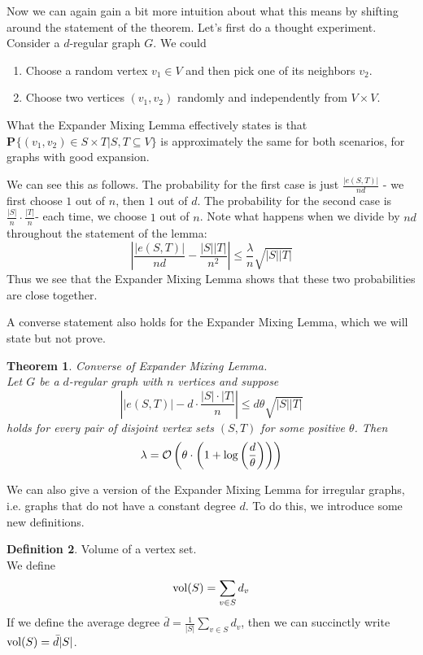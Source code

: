 \documentclass[11pt]{article}
\newtheorem{theorem}{Theorem}[section]
\theoremstyle{definition}
\newtheorem{definition}[theorem]{Definition}
\theoremstyle{definition}
\theoremstyle{definition}
\newcommand{\mc}[1]
{\mathcal{#1}}
\newcommand{\txt}[1]
{\textnormal{#1}}
\newcommand{\prob}[2]
{\textbf{P}_{#1}\{{#2}\}}
\begin{document}
Now we can again gain a bit more intuition about what this means by shifting around the statement of the theorem. Let's first do a thought experiment. Consider a $d$-regular graph $G$. We could 

\begin{enumerate}

\item Choose a random vertex $v_1 \in V$ and then pick one of its neighbors $v_2$. 

\item Choose two vertices $(v_1, v_2)$ randomly and independently from $V \times V$. 

\end{enumerate}

What the Expander Mixing Lemma effectively states is that $\prob{}{(v_1, v_2) \in S \times T | S, T \subseteq V}$ is approximately the same for both scenarios, for graphs with good expansion. 

We can see this as follows. The probability for the first case is just $\frac{|e(S, T)|}{nd}$ - we first choose $1$ out of $n$, then $1$ out of $d$. The probability for the second case is $\frac{|S|}{n} \cdot \frac{|T|}{n}$- each time, we choose $1$ out of $n$. Note what happens when we divide by $nd$ throughout the statement of the lemma: 
\[
\left| \frac{|e(S, T)|}{nd} - \frac{|S||T|}{n^2}\right| \leq \frac{\lambda}{n}\sqrt{|S||T|}
\]
Thus we see that the Expander Mixing Lemma shows that these two probabilities are close together.

A converse statement also holds for the Expander Mixing Lemma, which we will state but not prove. 
\begin{theorem} Converse of Expander Mixing Lemma. \\
Let $G$ be a $d$-regular graph with $n$ vertices and suppose 
\[
\left||e(S, T)| -  d \cdot \frac{|S| \cdot |T|}{n}\right| \leq d\theta\sqrt{|S||T|}
\]
holds for every pair of disjoint vertex sets $(S, T)$ for some positive $\theta$. Then
\[
\lambda = \mc{O}\left(\theta\cdot\left(1 + \txt{log}\left(\frac{d}{\theta}\right)\right)\right)
\]
\end{theorem}

We can also give a version of the Expander Mixing Lemma for irregular graphs, i.e. graphs that do not have a constant degree $d$. To do this, we introduce some new definitions. 

\begin{definition} Volume of a vertex set. \\
We define 
\[
\txt{vol}(S) = \sum_{v \in S} d_v
\]
If we define the average degree $\bar{d} = \frac{1}{|S|}\sum_{v \in S} d_v$, then we can succinctly write $\txt{vol}(S) = \bar{d}|S|$. 
\end{definition}
\end{document}

